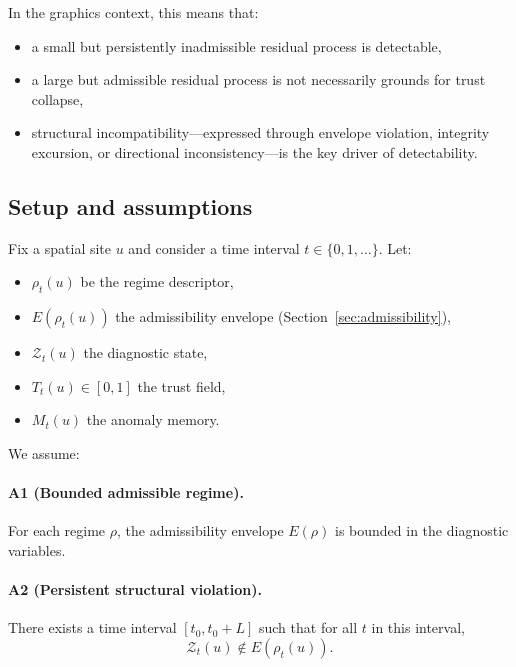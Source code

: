 \documentclass[11pt]{article}
\theoremstyle{definition}
\theoremstyle{plain}
\begin{document}
In the graphics context, this means that:
\begin{itemize}[leftmargin=1.5em]
    \item a small but persistently inadmissible residual process is detectable,
    \item a large but admissible residual process is not necessarily grounds for trust collapse,
    \item structural incompatibility—expressed through envelope violation, integrity excursion, or directional inconsistency—is the key driver of detectability.
\end{itemize}


\subsection{Setup and assumptions}

Fix a spatial site $u$ and consider a time interval $t\in\{0,1,\dots\}$. Let:
\begin{itemize}[leftmargin=1.5em]
    \item $\rho_t(u)$ be the regime descriptor,
    \item $E(\rho_t(u))$ the admissibility envelope (Section~\ref{sec:admissibility}),
    \item $\mathcal{Z}_t(u)$ the diagnostic state,
    \item $T_t(u)\in[0,1]$ the trust field,
    \item $M_t(u)$ the anomaly memory.
\end{itemize}

We assume:

\paragraph{A1 (Bounded admissible regime).}
For each regime $\rho$, the admissibility envelope $E(\rho)$ is bounded in the diagnostic variables.

\paragraph{A2 (Persistent structural violation).}
There exists a time interval $[t_0,t_0+L]$ such that for all $t$ in this interval,
\begin{equation}
\mathcal{Z}_t(u)\notin E(\rho_t(u)).
\end{equation}
\end{document}
